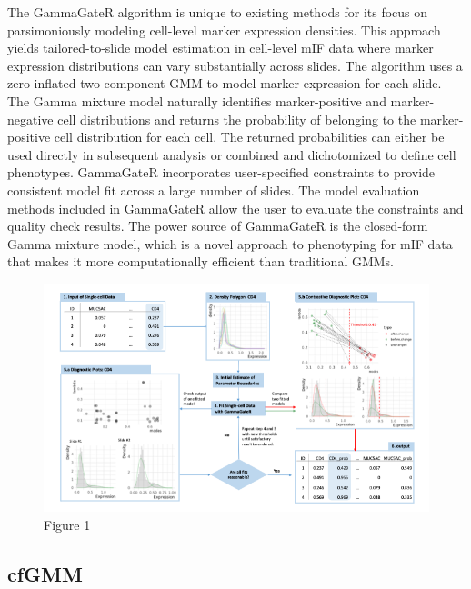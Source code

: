 \documentclass[
  letterpaper,
  DIV=11,
  numbers=noendperiod,
  oneside]{scrreprt}
\begin{document}
The GammaGateR algorithm is unique to existing methods for its focus on
parsimoniously modeling cell-level marker expression densities. This
approach yields tailored-to-slide model estimation in cell-level mIF
data where marker expression distributions can vary substantially across
slides. The algorithm uses a zero-inflated two-component GMM to model
marker expression for each slide. The Gamma mixture model naturally
identifies marker-positive and marker-negative cell distributions and
returns the probability of belonging to the marker-positive cell
distribution for each cell. The returned probabilities can either be
used directly in subsequent analysis or combined and dichotomized to
define cell phenotypes. GammaGateR incorporates user-specified
constraints to provide consistent model fit across a large number of
slides. The model evaluation methods included in GammaGateR allow the
user to evaluate the constraints and quality check results. The power
source of GammaGateR is the closed-form Gamma mixture model, which is a
novel approach to phenotyping for mIF data that makes it more
computationally efficient than traditional GMMs.

\begin{figure}

{\centering \includegraphics[width=1.2\textwidth,height=\textheight]{Figure1.png}

}

\caption{Figure 1}

\end{figure}

\hypertarget{cfgmm}{%
\subsection{cfGMM}\label{cfgmm}}
\end{document}
